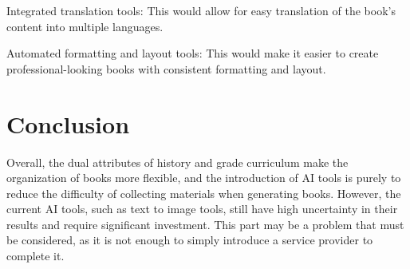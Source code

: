 Integrated translation tools: This would allow for easy translation of the book's content into multiple languages.

Automated formatting and layout tools: This would make it easier to create professional-looking books with consistent formatting and layout.

\section{Conclusion}
Overall, the dual attributes of history and grade curriculum make the organization of books more flexible, and the introduction of AI tools is purely to reduce the difficulty of collecting materials when generating books. 
However, the current AI tools, such as text to image tools, still have high uncertainty in their results and require significant investment. 
This part may be a problem that must be considered, as it is not enough to simply introduce a service provider to complete it.





